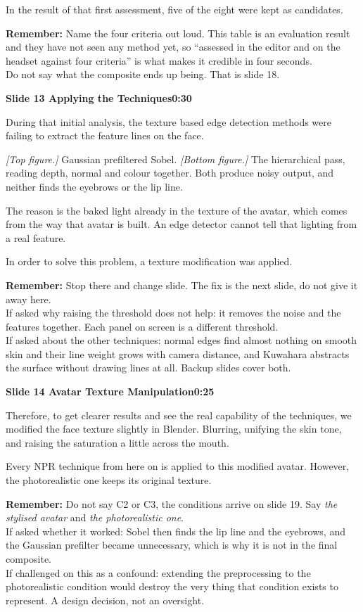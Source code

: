 \documentclass[11pt,a4paper]{article}
\newcommand{\slidehead}[3]{%
  \needspace{5\baselineskip}
  \vspace{0.9em}
  \noindent\colorbox{knblue}{\parbox{0.978\textwidth}{\vspace{1pt}\color{white}\textbf{Slide #1 \quad #2}\hfill\textbf{#3}\vspace{1pt}}}
  \vspace{0.35em}\par}
\newcommand{\remind}[1]{%
  \vspace{0.15em}
  \noindent\colorbox{knlight}{\parbox{0.972\textwidth}{\small\color{knblue}\textbf{Remember:} #1}}
  \vspace{0.2em}\par}
\newcommand{\pointto}[1]{{\color{knaccent}\textit{[#1]}}}
\begin{document}
In the result of that first assessment, five of the eight were kept as candidates.

\remind{Name the four criteria out loud. This table is an evaluation result and they have not seen any method yet, so ``assessed in the editor and on the headset against four criteria'' is what makes it credible in four seconds.\\[0.4em] Do not say what the composite ends up being. That is slide 18.}

\slidehead{13}{Applying the Techniques}{0:30}

During that initial analysis, the texture based edge detection methods were failing to extract the feature lines on the face.

\pointto{Top figure.} Gaussian prefiltered Sobel. \pointto{Bottom figure.} The hierarchical pass, reading depth, normal and colour together. Both produce noisy output, and neither finds the eyebrows or the lip line.

The reason is the baked light already in the texture of the avatar, which comes from the way that avatar is built. An edge detector cannot tell that lighting from a real feature.

In order to solve this problem, a texture modification was applied.

\remind{Stop there and change slide. The fix is the next slide, do not give it away here.\\[0.4em] If asked why raising the threshold does not help: it removes the noise and the features together. Each panel on screen is a different threshold.\\[0.4em] If asked about the other techniques: normal edges find almost nothing on smooth skin and their line weight grows with camera distance, and Kuwahara abstracts the surface without drawing lines at all. Backup slides cover both.}

\slidehead{14}{Avatar Texture Manipulation}{0:25}

Therefore, to get clearer results and see the real capability of the techniques, we modified the face texture slightly in Blender. Blurring, unifying the skin tone, and raising the saturation a little across the mouth.

Every NPR technique from here on is applied to this modified avatar. However, the photorealistic one keeps its original texture.

\remind{Do not say C2 or C3, the conditions arrive on slide 19. Say \emph{the stylised avatar} and \emph{the photorealistic one}.\\[0.4em] If asked whether it worked: Sobel then finds the lip line and the eyebrows, and the Gaussian prefilter became unnecessary, which is why it is not in the final composite.\\[0.4em] If challenged on this as a confound: extending the preprocessing to the photorealistic condition would destroy the very thing that condition exists to represent. A design decision, not an oversight.}
\end{document}
